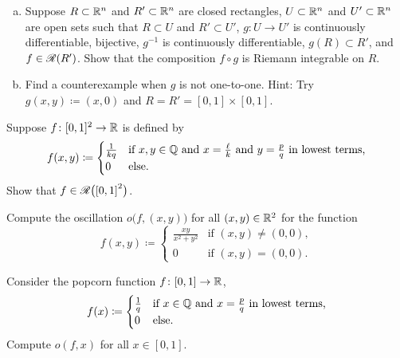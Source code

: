 \begin{exercise}
\leavevmode
\begin{enumerate}[a)]
\item
Suppose $R \subset {\mathbb{R}}^n$ and
$R' \subset {\mathbb{R}}^n$ are closed rectangles,
$U \subset {\mathbb{R}}^n$ and $U' \subset {\mathbb{R}}^n$ are open sets such that
$R \subset U$ and $R' \subset U'$,
$g \colon U \to U'$ is continuously differentiable, bijective,
$g^{-1}$ is continuously differentiable,
$g(R) \subset R'$, and
$f \in {\mathscr{R}}(R')$. 
Show that the composition $f \circ g$ is Riemann integrable on $R$.
\item
Find a counterexample when $g$ is not one-to-one.
Hint: Try $g(x,y) \coloneqq (x,0)$ and $R=R'=[0,1] \times [0,1]$.
\end{enumerate}
\end{exercise}

\begin{exercise}
Suppose 
$f \colon [0,1]^2 \to {\mathbb{R}}$ is defined by
\begin{equation*}
f(x,y) \coloneqq
\begin{cases}
\frac{1}{kq} & \text{if } x,y \in {\mathbb{Q}} \text{ and } x = \frac{\ell}{k}
\text{ and } y=\frac{p}{q} \text{ in lowest terms,} \\
0            & \text{else.}
\end{cases}
\end{equation*}
Show that $f \in {\mathscr{R}}\bigl({[0,1]}^2\bigr)$.
\end{exercise}

\begin{exercise}
Compute the oscillation $o\bigl(f,(x,y)\bigr)$ for all $(x,y) \in {\mathbb{R}}^2$
for the function
\begin{equation*}
f(x,y) \coloneqq
\begin{cases}
\frac{xy}{x^2+y^2} & \text{if } (x,y) \neq (0,0), \\
0                  & \text{if } (x,y) = (0,0) .
\end{cases}
\end{equation*}
\end{exercise}

\begin{exercise}
Consider the popcorn function $f \colon [0,1] \to {\mathbb{R}}$,
\begin{equation*}
f(x) \coloneqq
\begin{cases}
\frac{1}{q} & \text{if } x \in {\mathbb{Q}} \text{ and } x = \frac{p}{q}
 \text{ in lowest terms,} \\
0           & \text{else.}
\end{cases}
\end{equation*}
Compute $o(f,x)$ for all $x \in [0,1]$.
\end{exercise}

